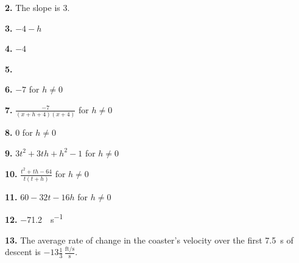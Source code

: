 \documentclass[12pt,]{book}
\theoremstyle{plain}
\theoremstyle{definition}
\numberwithin{equation}{section}
\begin{document}
                \par\smallskip
\noindent\textbf{2.}\quad{}
                    The slope is \(3\).%

                \par\smallskip
\noindent\textbf{3.}\quad{}
                    \(-4-h\)%

                \par\smallskip
\noindent\textbf{4.}\quad{}
                    \(-4\)%

                \par\smallskip
\noindent\textbf{5.}\quad{}
                        {
}

                \par\smallskip
\noindent\textbf{6.}\quad{}
                    \(-7\) for \(h\neq0\)%

                \par\smallskip
\noindent\textbf{7.}\quad{}
                    \(\frac{-7}{(x+h+4)(x+4)}\) for \(h\neq0\)%

                \par\smallskip
\noindent\textbf{8.}\quad{}
                    \(0\) for \(h\neq0\)%

                \par\smallskip
\noindent\textbf{9.}\quad{}
                    \(3t^2+3th+h^2-1\) for \(h\neq0\)%

                \par\smallskip
\noindent\textbf{10.}\quad{}
                    \(\frac{t^2+th-64}{t(t+h)}\) for \(h\neq0\)%

                \par\smallskip
\noindent\textbf{11.}\quad{}
                    \(60-32t-16h\) for \(h\neq0\)%

                \par\smallskip
\noindent\textbf{12.}\quad{}
                    \SI{-71.2}{\foot\per\second}%

                \par\smallskip
\noindent\textbf{13.}\quad{}
                    The average rate of change in the coaster's velocity over the first \SI{7.5}{\second} of descent is \(-13\frac{1}{3}\,\frac{\text{ft/s}}{\text{s}}\).%
\end{document}
